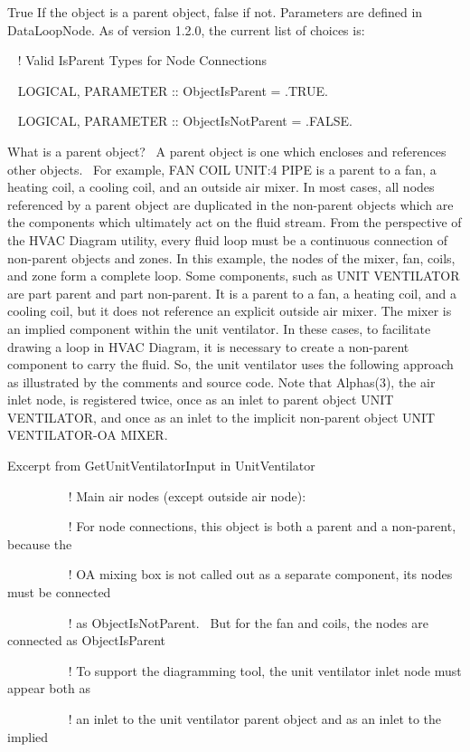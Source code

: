 True If the object is a parent object, false if not. Parameters are defined in DataLoopNode. As of version 1.2.0, the current list of choices is:

~ ! Valid IsParent Types for Node Connections

~ LOGICAL, PARAMETER :: ObjectIsParent = .TRUE.

~ LOGICAL, PARAMETER :: ObjectIsNotParent = .FALSE.

What is a parent object?~ A parent object is one which encloses and references other objects.~ For example, FAN COIL UNIT:4 PIPE is a parent to a fan, a heating coil, a cooling coil, and an outside air mixer. In most cases, all nodes referenced by a parent object are duplicated in the non-parent objects which are the components which ultimately act on the fluid stream. From the perspective of the HVAC Diagram utility, every fluid loop must be a continuous connection of non-parent objects and zones. In this example, the nodes of the mixer, fan, coils, and zone form a complete loop. Some components, such as UNIT VENTILATOR are part parent and part non-parent. It is a parent to a fan, a heating coil, and a cooling coil, but it does not reference an explicit outside air mixer. The mixer is an implied component within the unit ventilator. In these cases, to facilitate drawing a loop in HVAC Diagram, it is necessary to create a non-parent component to carry the fluid. So, the unit ventilator uses the following approach as illustrated by the comments and source code. Note that Alphas(3), the air inlet node, is registered twice, once as an inlet to parent object UNIT VENTILATOR, and once as an inlet to the implicit non-parent object UNIT VENTILATOR-OA MIXER.

Excerpt from GetUnitVentilatorInput in UnitVentilator

~~~~~~~~~ ! Main air nodes (except outside air node):

~~~~~~~~~ ! For node connections, this object is both a parent and a non-parent, because the

~~~~~~~~~ ! OA mixing box is not called out as a separate component, its nodes must be connected

~~~~~~~~~ ! as ObjectIsNotParent.~ But for the fan and coils, the nodes are connected as ObjectIsParent

~~~~~~~~~ ! To support the diagramming tool, the unit ventilator inlet node must appear both as

~~~~~~~~~ ! an inlet to the unit ventilator parent object and as an inlet to the implied

